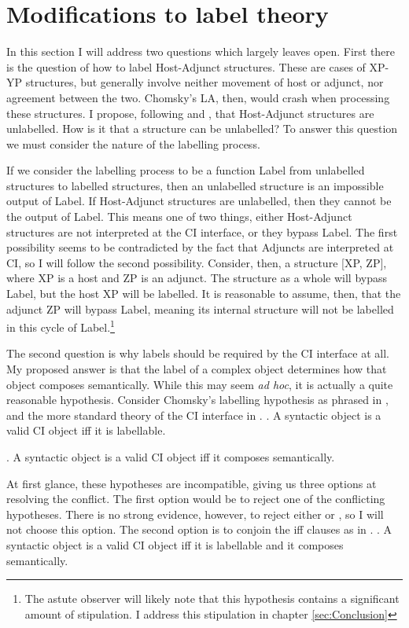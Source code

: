\documentclass[MilwayThesis]{subfiles}
\begin{document}
\section{Modifications to label theory}

In this section I will address two questions which \textcite{chomsky2013problems,chomsky2015problems} largely leaves open.
First there is the question of how to label Host-Adjunct structures.
These are cases of XP-YP structures, but generally involve neither movement of host or adjunct, nor agreement between the two.
Chomsky's LA, then, would crash when processing these structures.
I propose, following \textcite{hornstein2009theory} and \textcite{chametzky1996theory}, that Host-Adjunct structures are unlabelled.
How is it that a structure can be unlabelled?
To answer this question we must consider the nature of the labelling process. 

If we consider the labelling process to be a function Label from unlabelled structures to labelled structures, then an unlabelled structure is an impossible output of Label.
If Host-Adjunct structures are unlabelled, then they cannot be the output of Label.
This means one of two things, either Host-Adjunct structures are not interpreted at the CI interface, or they bypass Label.
The first possibility seems to be contradicted by the fact that Adjuncts are interpreted at CI, so I will follow the second possibility.
Consider, then, a structure [XP, ZP], where XP is a host and ZP is an adjunct.
The structure as a whole will bypass Label, but the host XP will be labelled.
It is reasonable to assume, then, that the adjunct ZP will bypass Label, meaning its internal structure will not be labelled in this cycle of Label.\footnote{The astute observer will likely note that this hypothesis contains a significant amount of stipulation.
I address this stipulation in chapter \ref{sec:Conclusion}}

The second question is why labels should be required by the CI interface at all.
My proposed answer is that the label of a complex object determines how that object composes semantically.
While this may seem \textit{ad hoc}, it is actually a quite reasonable hypothesis.
Consider Chomsky's labelling hypothesis as phrased in \Next, and the more standard theory of the CI interface in \NNext.
\ex. A syntactic object is a valid CI object iff it is labellable.

\ex. A syntactic object is a valid CI object iff it composes semantically.

At first glance, these hypotheses are incompatible, giving us three options at resolving the conflict.
The first option would be to reject one of the conflicting hypotheses.
There is no strong evidence, however, to reject either \LLast or \Last, so I will not choose this option.
The second option is to conjoin the iff clauses as in \Next.
\ex. A syntactic object is a valid CI object iff it is labellable and it composes semantically.
\end{document}
